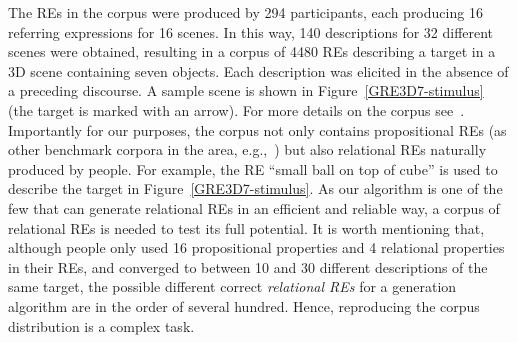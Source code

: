 The REs in the corpus were produced by 294 participants, each producing 16 referring expressions for 16 scenes. In this way, 140 descriptions for 32 different scenes were obtained, resulting in a corpus of 4480 REs describing a target in a 3D scene containing seven objects. Each description was elicited in the absence of a preceding discourse. 
A sample scene is shown in Figure~\ref{GRE3D7-stimulus} (the target is marked with an arrow). For more details on the corpus see~\cite[Chapter 5]{viet:gene11}. Importantly for our purposes, the corpus not only contains propositional REs (as other benchmark corpora in the area, e.g.,~\cite{gatt-balz-kow:2008:ENLG}) but also relational REs naturally produced by people. For example, the RE ``small ball on top of cube'' is used to describe the target in Figure~\ref{GRE3D7-stimulus}. As our algorithm is one of the few that can generate relational REs in an efficient and reliable way, a corpus of relational REs is needed to test its full potential. It is worth mentioning that, although people only used 16 propositional properties and 4 relational properties in their REs, and converged to between 10 and 30 different descriptions of the same target, the possible different correct \emph{relational REs} for a generation algorithm are in the order of several hundred. Hence, reproducing the corpus distribution is a complex task.    
% 
%
